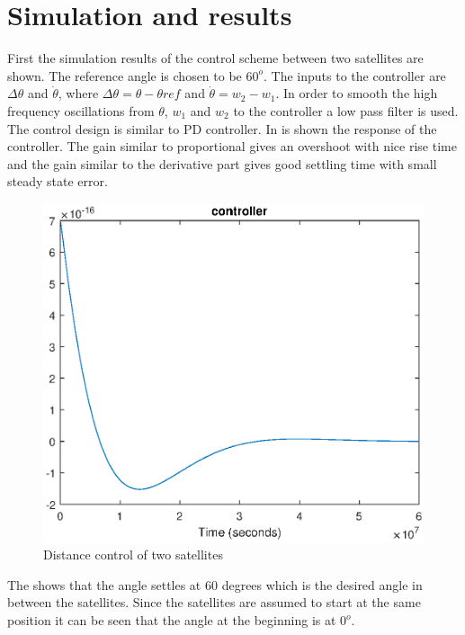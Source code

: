\section{Simulation and results}
 First the simulation results of the control scheme between two satellites are shown. The reference angle is chosen to be $60^{o}$. The inputs to the controller are $\Delta\theta$ and $\dot{\theta}$, where $\Delta\theta = \theta - \theta{ref}$ and $\dot{\theta} = w_2 - w_1$. In order to smooth the high frequency  oscillations from $\theta$, $w_1$ and $w_2$ to the controller a low pass filter is used. The control design is similar to PD controller. In  is shown the response of the controller. The gain similar to proportional gives an overshoot with nice rise time and the gain similar to the derivative part gives good settling time with small steady state error.   
%
\begin{figure}[H]
	\centering
	\includegraphics[width=0.9\linewidth]
	{figures/distance_control_twosat.eps}
	\caption{Distance control of two satellites }
	\label{fig:distancecontrol}
\end{figure}
%
The  shows that the angle settles at 60 degrees which is the desired angle in between the satellites. Since the satellites are assumed to start at the same position it can be seen that the angle at the beginning is at $0^{o}$. 
%
